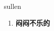 
\begin{frame}
{\huge sullen}
\begin{center}
\begin{enumerate}\Large
  \item \textbf{闷闷不乐的}
\end{enumerate}
\end{center}
\end{frame}
